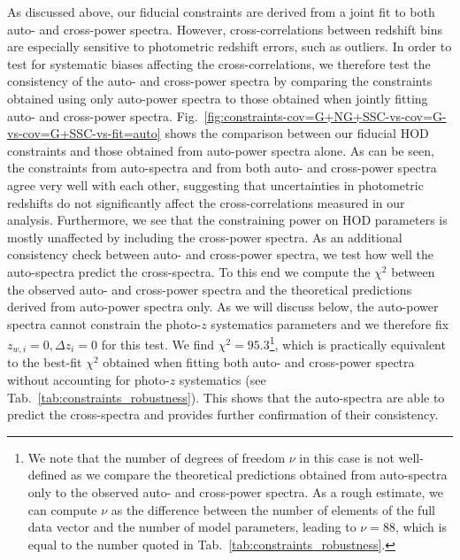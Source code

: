 \documentclass[a4paper,11pt]{article}
\begin{document}
      As discussed above, our fiducial constraints are derived from a joint fit to both auto- and cross-power spectra. However, cross-correlations between redshift bins are especially sensitive to photometric redshift errors, such as outliers. In order to test for systematic biases affecting the cross-correlations, we therefore test the consistency of the auto- and cross-power spectra by comparing the constraints obtained using only auto-power spectra to those obtained when jointly fitting auto- and cross-power spectra. Fig.~\ref{fig:constraints-cov=G+NG+SSC-vs-cov=G-vs-cov=G+SSC-vs-fit=auto} shows the comparison between our fiducial HOD constraints and those obtained from auto-power spectra alone. As can be seen, the constraints from auto-spectra and from both auto- and cross-power spectra agree very well with each other, suggesting that uncertainties in photometric redshifts do not significantly affect the cross-correlations measured in our analysis. Furthermore, we see that the constraining power on HOD parameters is mostly unaffected by including the cross-power spectra. As an additional consistency check between auto- and cross-power spectra, we test how well the auto-spectra predict the cross-spectra. To this end we compute the $\chi^{2}$ between the observed auto- and cross-power spectra and the theoretical predictions derived from auto-power spectra only. As we will discuss below, the auto-power spectra cannot constrain the photo-$z$ systematics parameters and we therefore fix $z_{w, i} = 0, \Delta z_{i} = 0$ for this test. We find $\chi^{2} = 95.3$\footnote{We note that the number of degrees of freedom $\nu$ in this case is not well-defined as we compare the theoretical predictions obtained from auto-spectra only to the observed auto- and cross-power spectra. As a rough estimate, we can compute $\nu$ as the difference between the number of elements of the full data vector and the number of model parameters, leading to $\nu = 88$, which is equal to the number quoted in Tab.~\ref{tab:constraints_robustness}.}, which is practically equivalent to the best-fit $\chi^{2}$ obtained when fitting both auto- and cross-power spectra without accounting for photo-$z$ systematics (see Tab.~\ref{tab:constraints_robustness}). This shows that the auto-spectra are able to predict the cross-spectra and provides further confirmation of their consistency. 
\end{document}
